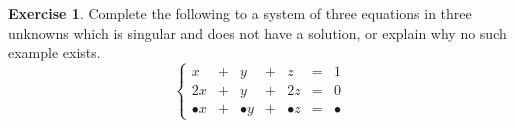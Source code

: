 \documentclass[11pt]{amsart}
\theoremstyle{definition}
\newtheorem{exercise}{Exercise}
\begin{document}
\begin{exercise}
Complete the following to a system of three equations in three unknowns which is singular and does not have a solution, or explain why no such example exists.
\[
\left\{
\begin{array}{ccccccc}
 x & + & y & + & z & = & 1 \\
2x & + & y & + & 2z & = & 0 \\
\bullet x & + & \bullet y & + &\bullet z &  = & \bullet
\end{array}
\right.
\]

\end{exercise}
\end{document}
